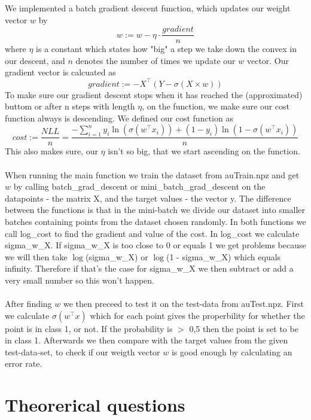 \documentclass[paper=a4, fontsize=11pt]{scrartcl} %
\numberwithin{equation}{section} %
\numberwithin{figure}{section} %
\numberwithin{table}{section} %
\begin{document}
We implemented a batch gradient descent function, which updates our weight vector $w$ by
\begin{equation*}
w:= w - \eta\cdot \dfrac{gradient}{n}
\end{equation*}
where $\eta$ is a constant which states how "big" a step we take down the convex in our descent, and $n$ denotes the number of times we update our $w$ vector. Our gradient vector is calcuated as
\begin{equation*}
gradient:= -X^\intercal(Y-\sigma(X\times w))
\end{equation*}
To make sure our gradient descent stops when it has reached the (approximated) buttom or after n steps with length $\eta$, on the function, we make sure our cost function always is descending. We defined our cost function as
\begin{equation*}
cost := \dfrac{NLL}{n} = \dfrac{- \sum_{i=1}^n y_i \ln(\sigma(w^\intercal x_i)) + (1-y_i) \ln(1-\sigma(w^\intercal x_i))}{n}
\end{equation*}
This also makes sure, our $\eta$ isn't so big, that we start ascending on the function. \\ \\
When running the main function we train the dataset from auTrain.npz and get $w$ by calling batch{\_}grad{\_}descent or mini{\_}batch{\_}grad{\_}descent on the datapoints - the matrix X, and the target values - the vector y. The difference between the functions is that in the mini-batch we divide our dataset into smaller batches containing points from the dataset chosen randomly. In both functions we call log{\_}cost to find the gradient and value of the cost. In log{\_}cost we calculate sigma{\_}w{\_}X. If sigma{\_}w{\_}X is too close to 0 or equals 1 we get problems because we will then take $\log$(sigma{\_}w{\_}X) or $\log$(1 - sigma{\_}w{\_}X) which equals infinity. Therefore if that's the case for sigma{\_}w{\_}X we then subtract or add a very small number so this won't happen.
\\ \\
After finding $w$ we then preceed to test it on the test-data from auTest.npz. First we calculate $\sigma(w^\intercal x)$ which for each point gives the properbility for whether the point is in class 1, or not. If the probability is $>$ 0,5 then the point is set to be in class 1. Afterwards we then compare with the target values from the given test-data-set, to check if our weigth vector $w$ is good enough by calculating an error rate.
    
\section*{Theorerical questions}
\end{document}
